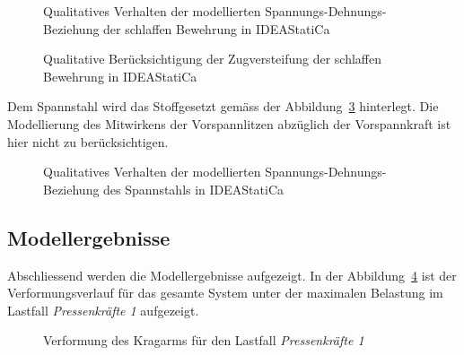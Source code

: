\documentclass[
  11pt,
  letterpaper,
]{scrreprt}
\begin{document}
\begin{figure}[H]


\caption{\label{fig-betonstahl_ideastat}Qualitatives Verhalten der
modellierten Spannungs-Dehnungs-Beziehung der schlaffen Bewehrung in
IDEAStatiCa}

\end{figure}%

\begin{figure}[H]


\caption{\label{fig-zugverst_ideastat}Qualitative Berücksichtigung der
Zugversteifung der schlaffen Bewehrung in IDEAStatiCa}

\end{figure}%

Dem Spannstahl wird das Stoffgesetzt gemäss der
Abbildung~\ref{fig-spannstahl_ideastat} hinterlegt. Die Modellierung des
Mitwirkens der Vorspannlitzen abzüglich der Vorspannkraft ist hier nicht
zu berücksichtigen.

\begin{figure}[H]


\caption{\label{fig-spannstahl_ideastat}Qualitatives Verhalten der
modellierten Spannungs-Dehnungs-Beziehung des Spannstahls in
IDEAStatiCa}

\end{figure}%

\subsection{Modellergebnisse}\label{modellergebnisse-3}

Abschliessend werden die Modellergebnisse aufgezeigt. In der
Abbildung~\ref{fig-def_kragarm_ideastat} ist der Verformungsverlauf für
das gesamte System unter der maximalen Belastung im Lastfall
\emph{Pressenkräfte 1} aufgezeigt.

\begin{figure}[H]


\caption{\label{fig-def_kragarm_ideastat}Verformung des Kragarms für den
Lastfall \emph{Pressenkräfte 1}}

\end{figure}%
\end{document}
